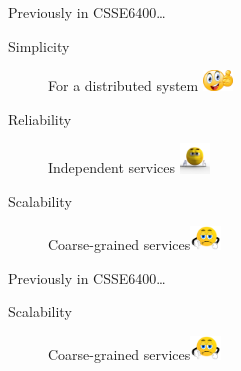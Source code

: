 \documentclass{slide}
\begin{document}
\begin{frame}{Previously in CSSE6400\dots}
    \vspace{1mm}
    {\LARGE
    \begin{description}
        \item[Simplicity] For a distributed system \tabto{15em}\includegraphics[width=8mm]{../../shared/images/thumbs-up.png}
        \item[Reliability] Independent services \tabto{15em}\includegraphics[trim=57 145 70 85,clip,width=8mm]{../../shared/images/neutral.png}
        \item[Scalability] Coarse-grained services\tabto{15em}\includegraphics[trim=22 19 22 12,clip,width=8mm]{../../shared/images/thumbs-down.png}
    \end{description}
    }
\end{frame}

\begin{frame}{Previously in CSSE6400\dots}
    \vspace{1mm}
    {\LARGE
    \begin{description}
        \item[Scalability] Coarse-grained services\tabto{15em}\includegraphics[trim=22 19 22 12,clip,width=8mm]{../../shared/images/thumbs-down.png}
     \end{description}
    }
\end{frame}


\end{document}
